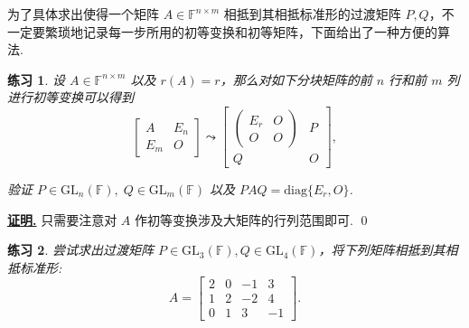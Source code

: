 \documentclass[10pt,openany]{article}
\theoremstyle{thmstyle} %
\newtheorem{practice}{练习}[section]
\theoremstyle{defstyle} %
\theoremstyle{prostyle} %
\theoremstyle{exastyle}
\theoremstyle{remstyle}
\renewenvironment{proof}[1][证明]{\par\underline{\textbf{#1.}} \;\fangsong}{\qed\par}
\newcommand{\F}{\mathbb{F}}
\newcommand{\gfn}{\text{GL}_n(\mathbb{F})}
\newcommand{\gfm}{\text{GL}_m(\mathbb{F})}
\newcommand{\nm}{^{n \times m}}
\newcommand{\diag}{\mathrm{diag}}
\begin{document}
为了具体求出使得一个矩阵 \( A \in \F\nm \) 相抵到其相抵标准形的过渡矩阵 \( P,Q \)，不一定要繁琐地记录每一步所用的初等变换和初等矩阵，下面给出了一种方便的算法.

\begin{practice} \label{prac3.2}
	设 \( A \in \F\nm \) 以及 \( r(A)=r\)，那么对如下分块矩阵的前 \( n \) 行和前 \( m \) 列进行初等变换可以得到
	\[ \begin{bmatrix}
		A & E_n \\
		E_m & O
	\end{bmatrix} \leadsto \begin{bmatrix}
		\begin{pmatrix}
			E_r & O \\
			O & O
		\end{pmatrix} & P \\
		Q & O
	\end{bmatrix}, \]
	
	验证 \( P \in \gfn, \; Q \in \gfm \) 以及 \( PAQ=\diag\{E_r,O\} \). 
\end{practice}

\begin{proof}
	只需要注意对 \( A \) 作初等变换涉及大矩阵的行列范围即可.
\end{proof}

\begin{practice} \label{prac3.3}
	尝试求出过渡矩阵 \( P \in \text{GL}_3(\F) ,Q \in \text{GL}_4(\F) \)，将下列矩阵相抵到其相抵标准形:
	\[ A=\begin{bmatrix}
		2 & 0 & -1 & 3 \\
		1 & 2 & -2 & 4 \\
		0 & 1 & 3 & -1
	\end{bmatrix}. \]
\end{practice}
\end{document}
